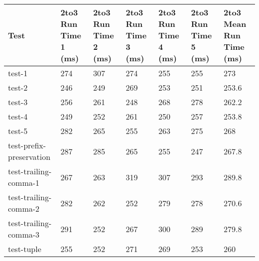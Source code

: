 \begin{table}[h!]
    \centering
    \begin{tabular}{@{}l|p{5em}p{5em}p{5em}p{5em}p{5em}p{5em}@{}}
    \toprule
    Test                                  & 2to3 Run Time 1 (ms) & 2to3 Run Time 2 (ms) & 2to3 Run Time 3 (ms) & 2to3 Run Time 4 (ms) & 2to3 Run Time 5 (ms) & 2to3 Mean Run Time (ms) \\ \midrule
    test-1                               & 274                  & 307                  & 274                  & 255                  & 255                  & 273                        \\
    test-2                               & 246                  & 249                  & 269                  & 253                  & 251                  & 253.6                      \\
    test-3                               & 256                  & 261                  & 248                  & 268                  & 278                  & 262.2                      \\ 
    test-4                               & 249                  & 252                  & 261                  & 250                  & 257                  & 253.8                      \\
    test-5                               & 282                  & 265                  & 255                  & 263                  & 275                  & 268                        \\
    test-prefix-preservation            & 287                  & 285                  & 265                  & 255                  & 247                  & 267.8                      \\
    test-trailing-comma-1              & 267                  & 263                  & 319                  & 307                  & 293                  & 289.8                      \\
    test-trailing-comma-2              & 282                  & 262                  & 252                  & 279                  & 278                  & 270.6                      \\
    test-trailing-comma-3              & 291                  & 252                  & 267                  & 300                  & 289                  & 279.8                      \\
    test-tuple                           & 255                  & 252                  & 271                  & 269                  & 253                  & 260                        \\

\end{tabular}
\end{table}
